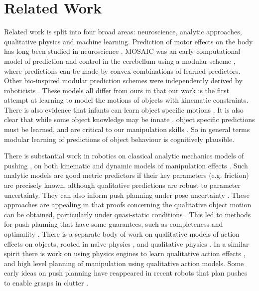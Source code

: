 \section{Related Work}\label{sec:Background}

Related work is split into four broad areas: neuroscience, analytic approaches, qualitative physics and machine learning. Prediction of motor effects on the body has long been studied in neuroscience \citep{Miall1996,flanagan03}.  MOSAIC was an early computational model of prediction and control in the cerebellum using a modular scheme \citep{Haruno_MOSAIC_2008}, where predictions can be made by convex combinations of learned predictors. Other bio-inspired modular prediction schemes were independently derived by roboticists \citep{demiris2006hierarchical}. These models all differ from ours in that our work is the first attempt at learning to model the motions of objects with kinematic constraints. There is also evidence that infants can learn object specific motions \citep{Bahrick1995}. It is also clear that while some object knowledge may be innate \citep{spelke1994early}, object specific predictions must be learned, and are critical to our manipulation skills \citep{flanagan06}. So in general terms modular learning of predictions of object behaviour is cognitively plausible.

There is substantial work in robotics on classical analytic mechanics models of pushing \citep{mason_manipulator_1982,lynch_mechanics_1992,peshkin_motion_1988,cappelleri_designing_2006}, on both kinematic and dynamic models of manipulation effects \citep{mason_mechanics_2001}. Such analytic models are good metric predictors if their key parameters (e.g. friction) are precisely known, although qualitative predictions are robust to parameter uncertainty. They can also inform push planning under pose uncertainty \citep{brost1985planning}. These approaches are appealing in that proofs concerning the qualitative object motion can be obtained, particularly under quasi-static conditions \citep{mason1985robot,peshkin_motion_1988}. This led to methods for push planning that have some guarantees, such as completeness and optimality \citep{lynchmason96}. There is a separate body of work on qualitative models of action effects on objects, rooted in naive physics \citep{hayes1995second}, and qualitative physics \citep{kuipers1986qualitative}. In a similar spirit there is work on using physics engines to learn qualitative action effects \citep{Mugan-tamd-12}, and high level planning of manipulation \citep{stillman08ijrr,roy2004mental} using qualitative action models. Some early ideas on push planning have reappeared in recent robots that plan pushes to enable grasps in clutter \citep{Dogar_2010}.

